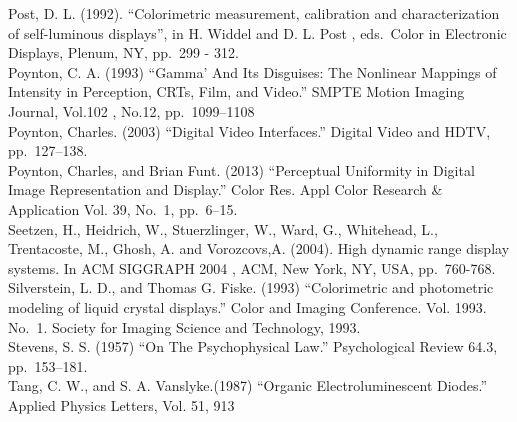 \documentclass[
  letterpaper,
]{book}
\begin{document}
Post, D. L. (1992). ``Colorimetric measurement, calibration and
characterization of self-luminous displays'', in H. Widdel and D. L.
Post , eds.~Color in Electronic Displays, Plenum, NY, pp.~299 - 312.\\
Poynton, C. A. (1993) ``Gamma' And Its Disguises: The Nonlinear Mappings
of Intensity in Perception, CRTs, Film, and Video.'' SMPTE Motion
Imaging Journal, Vol.102 , No.12, pp.~1099--1108\\
Poynton, Charles. (2003) ``Digital Video Interfaces.'' Digital Video and
HDTV, pp.~127--138.\\
Poynton, Charles, and Brian Funt. (2013) ``Perceptual Uniformity in
Digital Image Representation and Display.'' Color Res. Appl Color
Research \& Application Vol. 39, No.~1, pp.~6--15.\\
Seetzen, H., Heidrich, W., Stuerzlinger, W., Ward, G., Whitehead, L.,
Trentacoste, M., Ghosh, A. and Vorozcovs,A. (2004). High dynamic range
display systems. In ACM SIGGRAPH 2004 , ACM, New York, NY, USA,
pp.~760-768.\\
Silverstein, L. D., and Thomas G. Fiske. (1993) ``Colorimetric and
photometric modeling of liquid crystal displays.'' Color and Imaging
Conference. Vol. 1993. No.~1. Society for Imaging Science and
Technology, 1993.\\
Stevens, S. S. (1957) ``On The Psychophysical Law.'' Psychological
Review 64.3, pp.~153--181.\\
Tang, C. W., and S. A. Vanslyke.(1987) ``Organic Electroluminescent
Diodes.'' Applied Physics Letters, Vol. 51, 913
\end{document}
